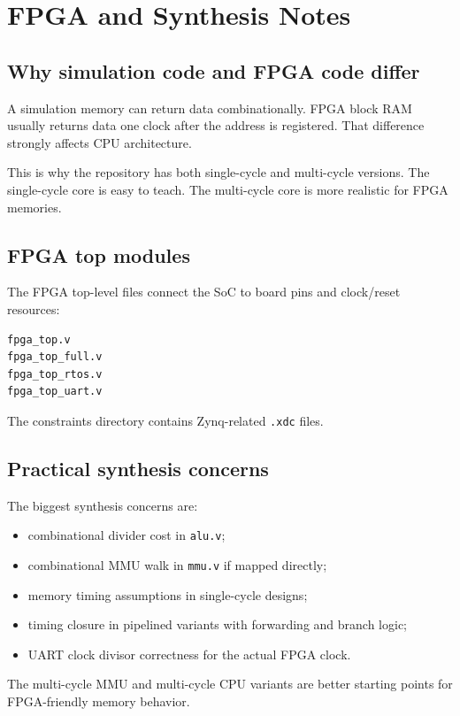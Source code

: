 \section{FPGA and Synthesis Notes}

\subsection{Why simulation code and FPGA code differ}

A simulation memory can return data combinationally. FPGA block RAM usually returns data one clock after the address is registered. That difference strongly affects CPU architecture.

This is why the repository has both single-cycle and multi-cycle versions. The single-cycle core is easy to teach. The multi-cycle core is more realistic for FPGA memories.

\subsection{FPGA top modules}

The FPGA top-level files connect the SoC to board pins and clock/reset resources:

\begin{lstlisting}[language={}]
fpga_top.v
fpga_top_full.v
fpga_top_rtos.v
fpga_top_uart.v
\end{lstlisting}

The constraints directory contains Zynq-related \texttt{.xdc} files.

\subsection{Practical synthesis concerns}

The biggest synthesis concerns are:

\begin{itemize}
\item combinational divider cost in \texttt{alu.v};
\item combinational MMU walk in \texttt{mmu.v} if mapped directly;
\item memory timing assumptions in single-cycle designs;
\item timing closure in pipelined variants with forwarding and branch logic;
\item UART clock divisor correctness for the actual FPGA clock.
\end{itemize}
The multi-cycle MMU and multi-cycle CPU variants are better starting points for FPGA-friendly memory behavior.

\bigskip
